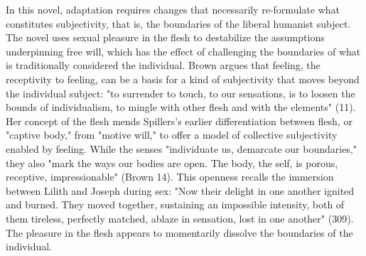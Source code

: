 \documentclass[11pt]{article}
\begin{document}
In this novel, adaptation requires changes that necessarily
re-formulate what constitutes subjectivity, that is, the boundaries of
the liberal humanist subject. The novel uses sexual pleasure in the
flesh to destabilize the assumptions underpinning free will, which has
the effect of challenging the boundaries of what is traditionally
considered the individual. Brown argues that feeling, the receptivity
to feeling, can be a basis for a kind of subjectivity that moves
beyond the individual subject: "to surrender to touch, to our
sensations, is to loosen the bounds of individualism, to mingle with
other flesh and with the elements" (11). Her concept of the flesh
mends Spillers's earlier differentiation between flesh, or "captive
body," from "motive will," to offer a model of collective subjectivity
enabled by feeling. While the senses "individuate us, demarcate our
boundaries," they also "mark the ways our bodies are open. The body,
the self, is porous, receptive, impressionable" (Brown 14). This
openness recalls the immersion between Lilith and Joseph during sex:
"Now their delight in one another ignited and burned. They moved
together, sustaining an impossible intensity, both of them tireless,
perfectly matched, ablaze in sensation, lost in one another"
(309). The pleasure in the flesh appears to momentarily dissolve the
boundaries of the individual.
\end{document}
